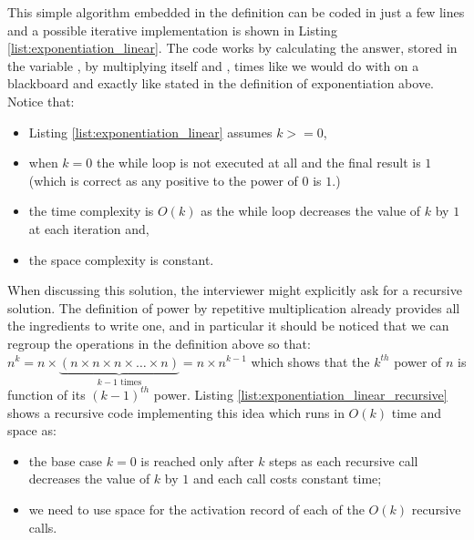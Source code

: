 This simple algorithm embedded in the definition can be coded in just a few lines and a possible iterative implementation is shown in Listing
\ref{list:exponentiation_linear}. The code works by calculating the answer, stored in the variable , by multiplying  itself and ,  times like we would do with on a blackboard and exactly like stated in the definition of exponentiation above.
Notice that:
\begin{itemize}
    \item Listing \ref{list:exponentiation_linear} assumes $k >=0$,
    \item when $k=0$ the while loop is not executed at all and the final result is $1$ (which is correct as any positive to the power of $0$ is $1$.)
    \item the time complexity is $O(k)$ as the while loop decreases the value of $k$ by $1$ at each iteration and,
    \item the space complexity is constant. 
\end{itemize}





When discussing this solution, the interviewer might explicitly ask for a recursive solution. The definition of power by repetitive multiplication already provides all the ingredients to write one, and in particular it should be noticed that we can regroup the operations in the definition above so that: $n^k = n \times \underbrace{(n \times n \times n \times \ldots \times n)}_{k-1 \text{ times}} = n \times n^{k-1}$ which shows that the ${k^{th}}$ power of $n$ is function of its ${(k-1)^{th}}$ power. Listing \ref{list:exponentiation_linear_recursive} shows a recursive code implementing this idea which runs in $O(k)$ time and space as:
\begin{itemize}
    \item the base case $k=0$ is reached only after $k$ steps as each recursive call decreases the value of $k$ by $1$ and each call costs constant time; 
    \item we need to use space for the activation record of each of the $O(k)$ recursive calls.
\end{itemize}






